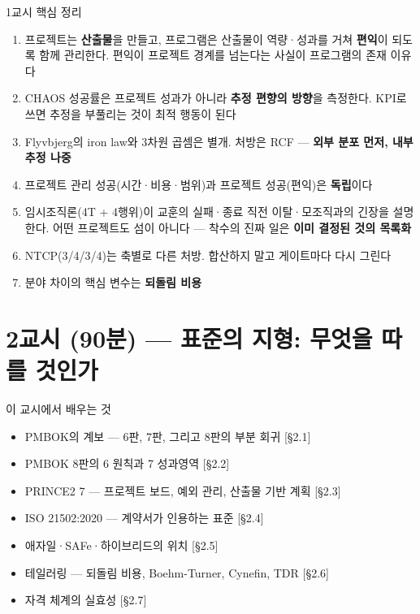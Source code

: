 \begin{frame}[allowframebreaks=1.0]{1교시 핵심 정리}
\small
\begin{enumerate}
\item\relax 프로젝트는 \textbf{산출물}을 만들고, 프로그램은 산출물이 역량·성과를 거쳐 \textbf{편익}이 되도록 함께 관리한다. 편익이 프로젝트 경계를 넘는다는 사실이 프로그램의 존재 이유다
\item\relax CHAOS 성공률은 프로젝트 성과가 아니라 \textbf{추정 편향의 방향}을 측정한다. KPI로 쓰면 추정을 부풀리는 것이 최적 행동이 된다
\item\relax Flyvbjerg의 iron law와 3차원 곱셈은 별개. 처방은 RCF — \textbf{외부 분포 먼저, 내부 추정 나중}
\item\relax 프로젝트 관리 성공(시간·비용·범위)과 프로젝트 성공(편익)은 \textbf{독립}이다
\item\relax 임시조직론(4T + 4행위)이 교훈의 실패·종료 직전 이탈·모조직과의 긴장을 설명한다. 어떤 프로젝트도 섬이 아니다 — 착수의 진짜 일은 \textbf{이미 결정된 것의 목록화}
\item\relax NTCP(3/4/3/4)는 축별로 다른 처방. 합산하지 말고 게이트마다 다시 그린다
\item\relax 분야 차이의 핵심 변수는 \textbf{되돌림 비용}
\end{enumerate}
\end{frame}

\section{2교시 (90분) — 표준의 지형: 무엇을 따를 것인가}

\begin{frame}[allowframebreaks=1.0]{이 교시에서 배우는 것}
\small
\begin{itemize}
\item\relax PMBOK의 계보 — 6판, 7판, 그리고 8판의 부분 회귀 [§2.1]
\item\relax PMBOK 8판의 6 원칙과 7 성과영역 [§2.2]
\item\relax PRINCE2 7 — 프로젝트 보드, 예외 관리, 산출물 기반 계획 [§2.3]
\item\relax ISO 21502:2020 — 계약서가 인용하는 표준 [§2.4]
\item\relax 애자일·SAFe·하이브리드의 위치 [§2.5]
\item\relax 테일러링 — 되돌림 비용, Boehm-Turner, Cynefin, TDR [§2.6]
\item\relax 자격 체계의 실효성 [§2.7]
\end{itemize}
\end{frame}

